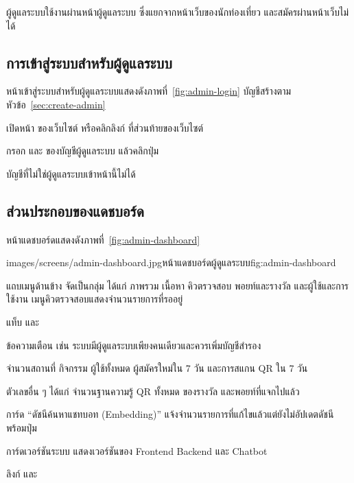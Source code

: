 ผู้ดูแลระบบใช้งานผ่านหน้าผู้ดูแลระบบ ซึ่งแยกจากหน้าเว็บของนักท่องเที่ยว และสมัครผ่านหน้าเว็บไม่ได้

\subsection{การเข้าสู่ระบบสำหรับผู้ดูแลระบบ}
\label{sec:admin-login}

หน้าเข้าสู่ระบบสำหรับผู้ดูแลระบบแสดงดังภาพที่~\ref{fig:admin-login} บัญชีสร้างตามหัวข้อ~\ref{sec:create-admin}


\begin{steps}
  \item เปิดหน้า  ของเว็บไซต์ หรือคลิกลิงก์  ที่ส่วนท้ายของเว็บไซต์
  \item กรอก  และ  ของบัญชีผู้ดูแลระบบ แล้วคลิกปุ่ม 
\end{steps}

บัญชีที่ไม่ใช่ผู้ดูแลระบบเข้าหน้านี้ไม่ได้

\subsection{ส่วนประกอบของแดชบอร์ด}

หน้าแดชบอร์ดแสดงดังภาพที่~\ref{fig:admin-dashboard}

\begin{screenshot}[width=\linewidth]{images/screens/admin-dashboard.jpg}{หน้าแดชบอร์ดผู้ดูแลระบบ}{fig:admin-dashboard}
\end{screenshot}

\begin{calloutlist}
  \item แถบเมนูด้านข้าง จัดเป็นกลุ่ม ได้แก่ ภาพรวม เนื้อหา คิวตรวจสอบ พอยท์และรางวัล และผู้ใช้และการใช้งาน เมนูคิวตรวจสอบแสดงจำนวนรายการที่รออยู่
  \item แท็บ   และ 
  \item ข้อความเตือน เช่น ระบบมีผู้ดูแลระบบเพียงคนเดียวและควรเพิ่มบัญชีสำรอง
  \item จำนวนสถานที่ กิจกรรม ผู้ใช้ทั้งหมด ผู้สมัครใหม่ใน 7 วัน และการสแกน QR ใน 7 วัน
  \item ตัวเลขอื่น ๆ ได้แก่ จำนวนฐานความรู้ QR ทั้งหมด ของรางวัล และพอยท์ที่แจกไปแล้ว
  \item การ์ด ``ดัชนีค้นหาแชทบอท (Embedding)'' แจ้งจำนวนรายการที่แก้ไขแล้วแต่ยังไม่อัปเดตดัชนี พร้อมปุ่ม 
  \item การ์ดเวอร์ชันระบบ แสดงเวอร์ชันของ Frontend Backend และ Chatbot
  \item ลิงก์  และ 
\end{calloutlist}

